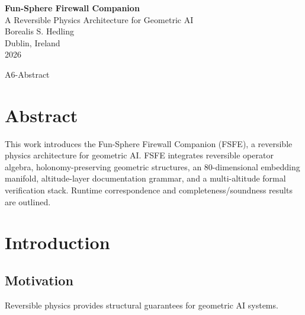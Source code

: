 \documentclass[11pt]{article}
\begin{document}


\begin{center}
{\Large \textbf{Fun-Sphere Firewall Companion}}\\[6pt]
{\large A Reversible Physics Architecture for Geometric AI}\\[12pt]
Borealis S. Hedling\\
Dublin, Ireland\\
2026
\end{center}

\newpage


\begin{citationmembrane}{A6-Abstract}
\end{citationmembrane}

\section*{Abstract}

This work introduces the Fun-Sphere Firewall Companion (FSFE), a reversible
physics architecture for geometric AI. FSFE integrates reversible operator
algebra, holonomy-preserving geometric structures, an 80-dimensional embedding
manifold, altitude-layer documentation grammar, and a multi-altitude formal
verification stack. Runtime correspondence and completeness/soundness results
are outlined.

\newpage



\section{Introduction}

\subsection{Motivation}
Reversible physics provides structural guarantees for geometric AI systems.
\end{document}
